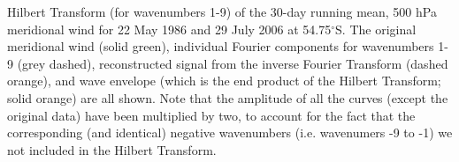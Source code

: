 \label{fig:example_hilbert}
Hilbert Transform (for wavenumbers 1-9) of the 30-day running mean, 500 hPa meridional wind for 22 May 1986 and 29 July 2006 at 54.75$^{\circ}$S. The original meridional wind (solid green), individual Fourier components for wavenumbers 1-9 (grey dashed), reconstructed signal from the inverse Fourier Transform (dashed orange), and wave envelope (which is the end product of the Hilbert Transform; solid orange) are all shown. Note that the amplitude of all the curves (except the original data) have been multiplied by two, to account for the fact that the corresponding (and identical) negative wavenumbers (i.e. wavenumers -9 to -1) we not included in the Hilbert Transform. 